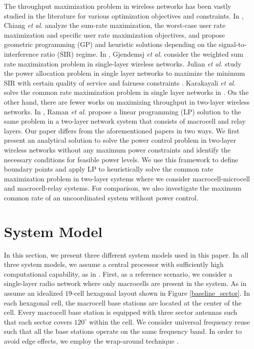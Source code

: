\documentclass[conference,letterpaper,final,10pt]{IEEEtran}
\begin{document}
The throughput maximization problem in wireless networks has been vastly studied in the literature for various optimization objectives and constraints. In \cite{Geometric}, Chiang \emph{et al.} analyze the sum-rate maximization, the worst-case user rate maximization and specific user rate maximization objectives, and propose geometric programming (GP) and heuristic solutions depending on the signal-to-interference ratio (SIR) regime. In \cite{BinaryPC}, Gjendemsj \emph{et al.} consider the weighted sum rate maximization problem in single-layer wireless networks. Julian \emph{et al.} study the power allocation problem in single layer networks to maximize the minimum SIR with certain quality of service and fairness constraints \cite{BoydAdHoc}. Karakayali \emph{et al.} solve the common rate maximization problem in single layer networks in \cite{Karakayali}. On the other hand, there are fewer works on maximizing throughput in two-layer wireless networks. In \cite{RamanConf}, Raman \emph{et al.} propose a linear programming (LP) solution to the same problem in a two-layer network system that consists of macrocell and relay layers. Our paper differs from the aforementioned papers in two ways. We first present an analytical solution to solve the power control problem in two-layer wireless networks without any maximum power constraints and identify the necessary conditions for feasible power levels. We use this framework to define boundary points and apply LP to heuristically solve the common rate maximization problem in two-layer systems where we consider macrocell-microcell and macrocell-relay systems. For comparison, we also investigate the maximum common rate of an uncoordinated system without power control.

\section{System Model}\label{SystemModel}
In this section, we present three different system models used in this paper. In all three system models, we assume a central processor with sufficiently high computational capability, as in \cite{RamanConf,Karakayali,Goodman}. First, as a reference scenario, we consider a single-layer radio network where only macrocells are present in the system. As in \cite{RamanConf,Karakayali} assume an idealized $19$-cell hexagonal layout shown in Figure \ref{baseline_sector}. In each hexagonal cell, the macrocell base stations are located at the center of the cell. Every macrocell base station is equipped with three sector antennas such that each sector covers $120^\circ$ within the cell. We consider universal frequency reuse such that all the base stations operate on the same frequency band. In order to avoid edge effects, we employ the wrap-around technique \cite{RamanConf}.
\end{document}
